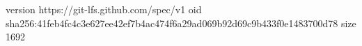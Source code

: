 version https://git-lfs.github.com/spec/v1
oid sha256:41feb4fc4c3e627ee42ef7b4ac474f6a29ad069b92d69c9b433f0e1483700d78
size 1692
